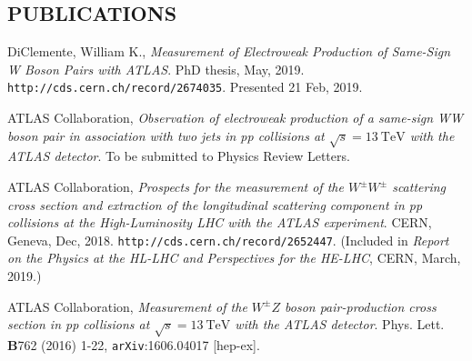 \documentclass{res}
\begin{document}
\begin{resume}
\section{PUBLICATIONS}
    DiClemente, William K., {\it Measurement of Electroweak Production of Same-Sign W Boson Pairs with ATLAS}.  PhD thesis, May, 2019. {\tt http://cds.cern.ch/record/2674035}. Presented 21 Feb, 2019.

    ATLAS Collaboration, {\it Observation of electroweak production of a same-sign WW boson pair in association with two jets in pp collisions at $\sqrt{s}=13~\textrm{TeV}$ with the ATLAS detector}. To be submitted to Physics Review Letters. %

    ATLAS Collaboration, {\it Prospects for the measurement of the $W^{\pm}W^{\pm}$ scattering cross section and extraction of the longitudinal scattering component in pp collisions at the High-Luminosity LHC with the ATLAS experiment}. CERN, Geneva, Dec, 2018. {\tt http://cds.cern.ch/record/2652447}. (Included in {\it Report on the Physics at the HL-LHC and Perspectives for the HE-LHC}, CERN, March, 2019.)

    ATLAS Collaboration, {\it Measurement of the $W^{\pm}Z$ boson pair-production cross section in pp collisions at $\sqrt{s}=13~\textrm{TeV}$ with the ATLAS detector}. Phys. Lett. {\bf B}762 (2016) 1-22, {\tt arXiv}:1606.04017 [hep-ex].
 
 
 
\end{resume}
\end{document}
